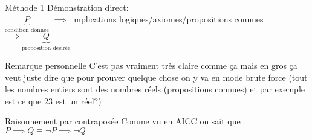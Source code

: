 \
\begin{parag}{Méthode 1}
    Démonstration direct:\\ $\underbrace{P}_{\text{condition donnée}}$ $\implies$ implications logiques/axiomes/propositions connues $\implies \underbrace{Q}_{\text{proposition désirée}}$
    \begin{subparag}{Remarque personnelle}
        C'est pas vraiment très claire comme ça mais en gros ça veut juste dire que pour prouver quelque chose on y va en mode brute force (tout les nombres entiers sont des nombres réels (propositions connues) et par exemple est ce que $23$ est un réel?) 
    \end{subparag}
\end{parag}
\begin{parag}{Raisonnement par contraposée}
    Comme vu en AICC on sait que $P \implies Q \equiv \neg P \implies \neg Q$
\end{parag}
